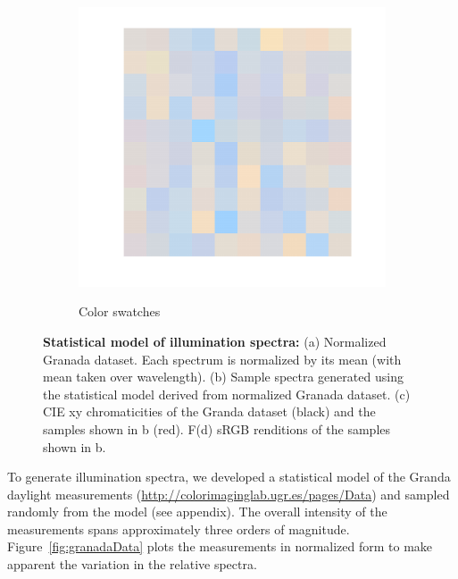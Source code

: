 \documentclass{jov}
\begin{document}
\begin{figure}
\begin{subfigure}[b]{0.24 \textwidth}
        \label{fig:xyDiagram}
        \end{subfigure}
      	\begin{subfigure}[b]{0.24 \textwidth}
    \centering
        \caption{Color swatches}
        \includegraphics[width=\textwidth]{../FiguresDraft4/Figure6/Figure6_d.pdf}
        \label{fig:sRGBIlluminant}
    \end{subfigure}
    \caption{{\bf Statistical model of illumination spectra:} (a) Normalized Granada dataset. Each spectrum is normalized by its mean (with mean taken over wavelength). (b) Sample spectra generated using the statistical model derived from normalized Granada dataset. (c) CIE xy chromaticities of the Granda dataset (black) and the samples shown in b (red). F(d) sRGB renditions of the samples shown in b.}
\label{fig:illuminant}
\end{figure}

To generate illumination spectra, we developed a statistical model of the Granda daylight measurements (\href{http://colorimaginglab.ugr.es/pages/Data}{http://colorimaginglab.ugr.es/pages/Data}) \cite{hernandez2001color} and sampled randomly from the model (see appendix).
The overall intensity of the measurements spans approximately three orders of magnitude.
Figure~\ref{fig:granadaData} plots the measurements in normalized form to make apparent the variation in the relative spectra.
\end{document}

